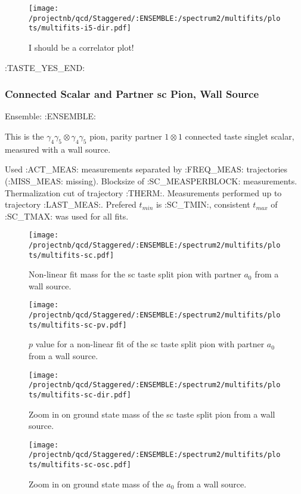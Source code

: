 \begin{figure}[H]
\centering
\texttt{[image: /projectnb/qcd/Staggered/:ENSEMBLE:/spectrum2/multifits/plots/multifits-i5-dir.pdf]}
\caption{I should be a correlator plot!}
\end{figure}

\clearpage
:TASTE_YES_END:

\subsubsection{Connected Scalar and Partner sc Pion, Wall Source}

Ensemble: :ENSEMBLE:

This is the $\gamma_4 \gamma_5 \otimes \gamma_4 \gamma_5$ pion, parity partner $1 \otimes 1$ connected taste singlet scalar, measured with a wall source. 

{\small{Used :ACT_MEAS: measurements separated by :FREQ_MEAS: trajectories (:MISS_MEAS: missing). Blocksize of :SC_MEASPERBLOCK: measurements. Thermalization cut of trajectory :THERM:. Measurements performed up to trajectory :LAST_MEAS:. Prefered $t_{min}$ is :SC_TMIN:, consistent $t_{max}$ of :SC_TMAX: was used for all fits.}}

\begin{multicols}{2}
\begin{figure}[H]
\centering
\texttt{[image: /projectnb/qcd/Staggered/:ENSEMBLE:/spectrum2/multifits/plots/multifits-sc.pdf]}
\caption{Non-linear fit mass for the sc taste split pion with partner $a_0$ from a wall source.}
\end{figure}
\columnbreak
\begin{figure}[H]
\centering
\texttt{[image: /projectnb/qcd/Staggered/:ENSEMBLE:/spectrum2/multifits/plots/multifits-sc-pv.pdf]}
\caption{$p$ value for a non-linear fit of the sc taste split pion with partner $a_0$ from a wall source.}
\end{figure}
\end{multicols}

\begin{multicols}{2}
\begin{figure}[H]
\centering
\texttt{[image: /projectnb/qcd/Staggered/:ENSEMBLE:/spectrum2/multifits/plots/multifits-sc-dir.pdf]}
\caption{Zoom in on ground state mass of the sc taste split pion from a wall source.}
\end{figure}
\columnbreak
\begin{figure}[H]
\centering
\texttt{[image: /projectnb/qcd/Staggered/:ENSEMBLE:/spectrum2/multifits/plots/multifits-sc-osc.pdf]}
\caption{Zoom in on ground state mass of the $a_0$ from a wall source.}
\end{figure}
\end{multicols}

